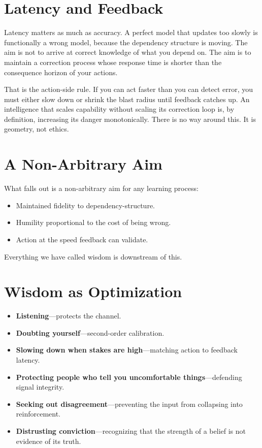 \documentclass{article}
\begin{document}
\section*{Latency and Feedback}

Latency matters as much as accuracy. A perfect model that updates too slowly is functionally a wrong model, because the dependency structure is moving. The aim is not to arrive at correct knowledge of what you depend on. The aim is to maintain a correction process whose response time is shorter than the consequence horizon of your actions.

That is the action-side rule. If you can act faster than you can detect error, you must either slow down or shrink the blast radius until feedback catches up. An intelligence that scales capability without scaling its correction loop is, by definition, increasing its danger monotonically. There is no way around this. It is geometry, not ethics.

\section*{A Non-Arbitrary Aim}

What falls out is a non-arbitrary aim for any learning process:
\begin{itemize}
    \item Maintained fidelity to dependency-structure.
    \item Humility proportional to the cost of being wrong.
    \item Action at the speed feedback can validate.
\end{itemize}

Everything we have called wisdom is downstream of this.

\section*{Wisdom as Optimization}

\begin{itemize}
    \item \textbf{Listening}---protects the channel.
    \item \textbf{Doubting yourself}---second-order calibration.
    \item \textbf{Slowing down when stakes are high}---matching action to feedback latency.
    \item \textbf{Protecting people who tell you uncomfortable things}---defending signal integrity.
    \item \textbf{Seeking out disagreement}---preventing the input from collapsing into reinforcement.
    \item \textbf{Distrusting conviction}---recognizing that the strength of a belief is not evidence of its truth.
\end{itemize}
\end{document}
